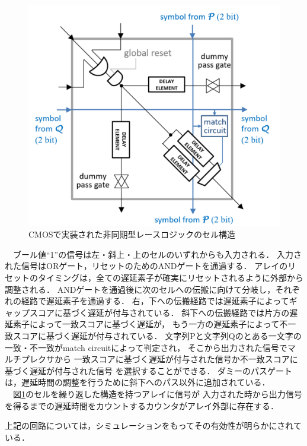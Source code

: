 \begin{itemize}
\begin{figure}[t!]
\begin{center}
\includegraphics[keepaspectratio,scale=0.3]{fig/2/CMOSasync.png}
\caption{CMOSで実装された非同期型レースロジックのセル構造\cite{madhavan20174}}
\label{fig:CMOSasync}
\end{center}
\end{figure}
\ \ ブール値“1”の信号は左・斜上・上のセルのいずれからも入力される．
入力された信号はORゲート，リセットのためのANDゲートを通過する．
アレイのリセットのタイミングは，全ての遅延素子が確実にリセットされるように外部から調整される．
ANDゲートを通過後に次のセルへの伝搬に向けて分岐し，それぞれの経路で遅延素子を通過する．
右，下への伝搬経路では遅延素子によってギャップスコアに基づく遅延が付与されている．
斜下への伝搬経路では片方の遅延素子によって一致スコアに基づく遅延が，
もう一方の遅延素子によって不一致スコアに基づく遅延が付与されている．
文字列Pと文字列Qのとある一文字の一致・不一致がmatch circuitによって判定され，
そこから出力された信号でマルチプレクサから
一致スコアに基づく遅延が付与された信号か不一致スコアに基づく遅延が付与された信号
を選択することができる．
ダミーのパスゲートは，遅延時間の調整を行うために斜下へのパス以外に追加されている．\\
\ \ 図\ref{fig:CMOSasync}のセルを繰り返した構造を持つアレイに信号が
入力された時から出力信号を得るまでの遅延時間をカウントするカウンタがアレイ外部に存在する．
\end{itemize}
上記の回路については，シミュレーションをもってその有効性が明らかにされている．


